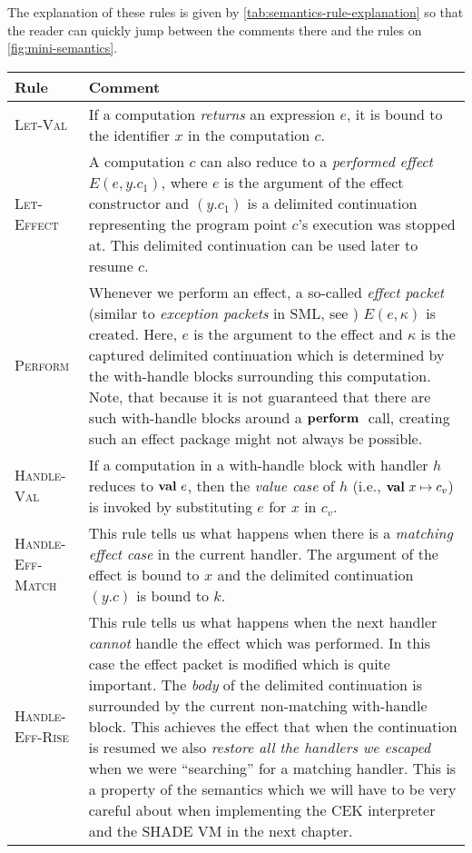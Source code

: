 \documentclass[class=article, crop=false]{standalone}
\begin{document}
The explanation of these rules is given by \autoref{tab:semantics-rule-explanation}
so that the reader can quickly jump between the comments there and the rules on
\autoref{fig:mini-semantics}.

\begin{table}
  \small
  \centering
  {\renewcommand{\arraystretch}{1.3}
  \begin{tabularx}{\textwidth}{lX}
  \toprule
  Rule & Comment \\
  \midrule
  \textsc{Let-Val} & 
    If a computation \emph{returns} an expression $e$, it is bound to the
    identifier $x$ in the computation $c$. \\

  \textsc{Let-Effect} & 
    A computation $c$ can also reduce to a \emph{performed effect} $E(e, y.c_1)$,
    where $e$ is the argument of the effect constructor and $(y.c_1)$ is a
    delimited continuation representing the program point $c$'s execution was
    stopped at. This delimited continuation can be used later to resume $c$. \\

  \textsc{Perform} &
    Whenever we perform an effect, a so-called \emph{effect packet} (similar to
    \emph{exception packets} in SML, see \cite{paulson1996ml}) $E(e, \kappa)$
    is created. Here, $e$ is the argument to the effect and $\kappa$ is the
    captured delimited continuation which is determined by the with-handle
    blocks surrounding this computation. Note, that because it is not guaranteed
    that there are such with-handle blocks around a $\mathbf{perform}\ $ call, creating
    such an effect package might not always be possible. \\

  \textsc{Handle-Val} & 
    If a computation in a with-handle block with handler $h$ reduces to
    $\mathbf{val}\  e$, then the \emph{value case} of $h$ (i.e., $\mathbf{val}\  x \mapsto c_v$)
    is invoked by substituting $e$ for $x$ in $c_v$. \\

  \textsc{Handle-Eff-Match} &
    This rule tells us what happens when there is a \emph{matching effect case}
    in the current handler. The argument of the effect is bound to $x$ and the
    delimited continuation $(y.c)$ is bound to $k$. \\

  \textsc{Handle-Eff-Rise} &
    This rule tells us what happens when the next handler \emph{cannot} handle
    the effect which was performed. In this case the effect packet is modified
    which is quite important. The \emph{body} of the delimited continuation is
    surrounded by the current non-matching with-handle block. This achieves the
    effect that when the continuation is resumed we also \emph{restore all the
    handlers we escaped} when we were ``searching'' for a matching handler.
    This is a property of the semantics which we will have to be very careful
    about when implementing the CEK interpreter and the SHADE VM in the next
    chapter.\\


\end{tabularx}}
\end{table}
\end{document}
